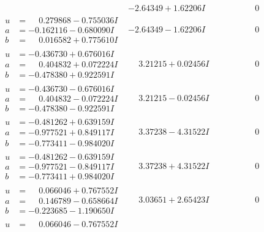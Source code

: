 \documentclass[1p]{elsarticle_modified}
\theoremstyle{definition}
\begin{document}
$$\begin{array}{c|c|c}
 & -2.64349 + 1.62206 I & \phantom{-0.000000 } 0 \\ \hline\begin{aligned}
u &= \phantom{-}0.279868 - 0.755036 I \\
a &= -0.162116 - 0.680090 I \\
b &= \phantom{-}0.016582 + 0.775610 I\end{aligned}
 & -2.64349 - 1.62206 I & \phantom{-0.000000 } 0 \\ \hline\begin{aligned}
u &= -0.436730 + 0.676016 I \\
a &= \phantom{-}0.404832 + 0.072224 I \\
b &= -0.478380 + 0.922591 I\end{aligned}
 & \phantom{-}3.21215 + 0.02456 I & \phantom{-0.000000 } 0 \\ \hline\begin{aligned}
u &= -0.436730 - 0.676016 I \\
a &= \phantom{-}0.404832 - 0.072224 I \\
b &= -0.478380 - 0.922591 I\end{aligned}
 & \phantom{-}3.21215 - 0.02456 I & \phantom{-0.000000 } 0 \\ \hline\begin{aligned}
u &= -0.481262 + 0.639159 I \\
a &= -0.977521 + 0.849117 I \\
b &= -0.773411 - 0.984020 I\end{aligned}
 & \phantom{-}3.37238 - 4.31522 I & \phantom{-0.000000 } 0 \\ \hline\begin{aligned}
u &= -0.481262 - 0.639159 I \\
a &= -0.977521 - 0.849117 I \\
b &= -0.773411 + 0.984020 I\end{aligned}
 & \phantom{-}3.37238 + 4.31522 I & \phantom{-0.000000 } 0 \\ \hline\begin{aligned}
u &= \phantom{-}0.066046 + 0.767552 I \\
a &= \phantom{-}0.146789 - 0.658664 I \\
b &= -0.223685 - 1.190650 I\end{aligned}
 & \phantom{-}3.03651 + 2.65423 I & \phantom{-0.000000 } 0 \\ \hline\begin{aligned}
u &= \phantom{-}0.066046 - 0.767552 I \\

\end{aligned}
\end{array}$$
\end{document}
